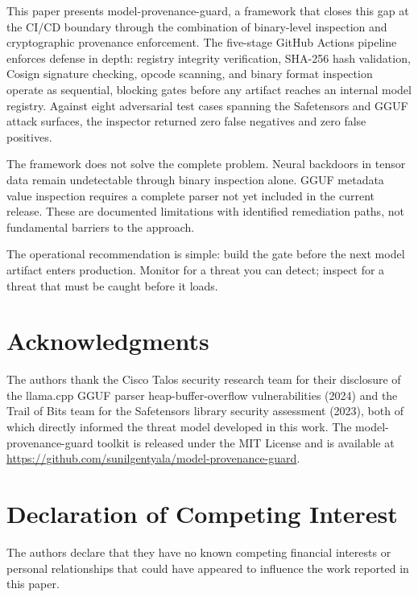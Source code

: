 \documentclass[preprint,12pt,twocolumn]{elsarticle}
\begin{document}
This paper presents model-provenance-guard, a framework that closes this
gap at the CI/CD boundary through the combination of binary-level inspection
and cryptographic provenance enforcement. The five-stage GitHub Actions
pipeline enforces defense in depth: registry integrity verification, SHA-256
hash validation, Cosign signature checking, opcode scanning, and binary
format inspection operate as sequential, blocking gates before any artifact
reaches an internal model registry. Against eight adversarial test cases
spanning the Safetensors and GGUF attack surfaces, the inspector returned
zero false negatives and zero false positives.

The framework does not solve the complete problem. Neural backdoors in tensor
data remain undetectable through binary inspection alone. GGUF metadata value
inspection requires a complete parser not yet included in the current release.
These are documented limitations with identified remediation paths, not
fundamental barriers to the approach.

The operational recommendation is simple: build the gate before the next
model artifact enters production. Monitor for a threat you can detect;
inspect for a threat that must be caught before it loads.

\section*{Acknowledgments}

The authors thank the Cisco Talos security research team for their
disclosure of the llama.cpp GGUF parser heap-buffer-overflow vulnerabilities
(2024) and the Trail of Bits team for the Safetensors library security
assessment (2023), both of which directly informed the threat model
developed in this work. The model-provenance-guard toolkit is released
under the MIT License and is available at
\url{https://github.com/sunilgentyala/model-provenance-guard}.

\section*{Declaration of Competing Interest}

The authors declare that they have no known competing financial interests
or personal relationships that could have appeared to influence the work
reported in this paper.
\end{document}
